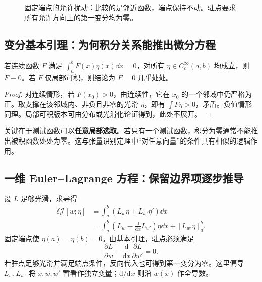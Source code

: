 \begin{figure}[H]
\centering
{}
\caption{固定端点的允许扰动：比较的是邻近函数，端点保持不动。驻点要求所有允许方向上的第一变分均为零。}
\end{figure}

\subsection{变分基本引理：为何积分关系能推出微分方程}

\begin{lemma}[变分基本引理]
若连续函数 $F$ 满足 $\int_a^b F(x)\eta(x)\dd x=0$，对所有 $\eta\in C_c^\infty(a,b)$ 均成立，则 $F\equiv0$。若 $F$ 仅局部可积，则结论为 $F=0$ 几乎处处。
\end{lemma}
\begin{proof}
对连续情形，若 $F(x_0)>0$，由连续性，它在 $x_0$ 的一个邻域中仍严格为正。取支撑在该邻域内、非负且非零的光滑 $\eta$，即有 $\int F\eta>0$，矛盾。负值情形同理。局部可积版本可由分布或光滑化论证得到，此处不展开。
\end{proof}

关键在于测试函数可以\textbf{任意局部选取}。若只有一个测试函数，积分为零通常不能推出被积函数处处为零。这与张量识别定理中“对任意向量”的条件具有相似的逻辑作用。

\subsection{一维 Euler--Lagrange 方程：保留边界项逐步推导}

设 $L$ 足够光滑，求导得
\begin{align}
 \delta\mathcal J[w;\eta]
 &=\int_a^b(L_w\eta+L_{w'}\eta')\dd x\\
 &=\int_a^b\left(L_w-\frac{\mathrm d}{\mathrm dx}L_{w'}\right)\eta\dd x
 +[L_{w'}\eta]_a^b.\label{eq:variation-boundary-1d}
\end{align}
固定端点使 $\eta(a)=\eta(b)=0$。由基本引理，驻点必须满足
\begin{equation}
 \boxed{\frac{\partial L}{\partial w}
 -\frac{\mathrm d}{\mathrm dx}\frac{\partial L}{\partial w'}=0.}
 \label{eq:el-1d}
\end{equation}
若驻点足够光滑并满足端点条件，反向代入也可得到第一变分为零。这里偏导 $L_w,L_{w'}$ 将 $x,w,w'$ 暂看作独立变量；$\mathrm d/\mathrm dx$ 则沿 $w(x)$ 作全导数。

